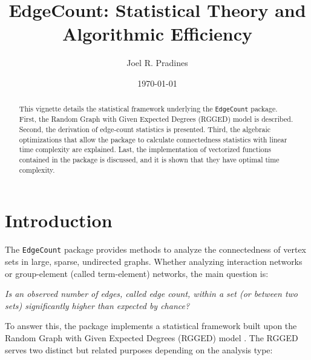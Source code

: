 \documentclass{article}\usepackage[]{graphicx}\usepackage[]{xcolor}
\title{EdgeCount: Statistical Theory and Algorithmic Efficiency}
\author{Joel R. Pradines}
\date{\today}
\begin{document}
\maketitle

\begin{abstract}
\noindent This vignette details the statistical framework underlying the \texttt{EdgeCount} package. First, the Random Graph with Given Expected Degrees (RGGED) model is described. Second, the derivation of edge-count statistics is presented. Third, the algebraic optimizations that allow the package to calculate connectedness statistics with linear time complexity are explained. Last, the implementation of vectorized functions contained in the package is discussed, and it is shown that they have optimal time complexity.
\end{abstract}

\tableofcontents

\section{Introduction}

The \texttt{EdgeCount} package provides methods to analyze the connectedness of vertex sets in large, sparse, undirected graphs. Whether analyzing interaction networks or group-element (called term-element) networks, the main question is:

\textit{Is an observed number of edges, called edge count, within a set (or between two sets) significantly higher than expected by chance?}

To answer this, the package implements a statistical framework built upon the Random Graph with Given Expected Degrees (RGGED) model \cite{chung2002connected,RGGED2}. The RGGED serves two distinct but related purposes depending on the analysis type:
\end{document}
